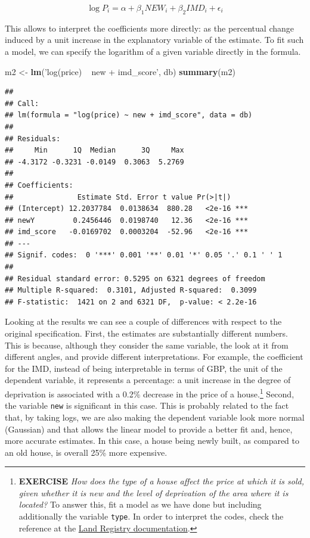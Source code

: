 \documentclass[
]{book}
\newenvironment{Shaded}{\begin{snugshade}}{\end{snugshade}}
\newcommand{\KeywordTok}[1]{\textcolor[rgb]{0.13,0.29,0.53}{\textbf{#1}}}
\newcommand{\NormalTok}[1]{#1}
\newcommand{\StringTok}[1]{\textcolor[rgb]{0.31,0.60,0.02}{#1}}
\begin{document}
\[
\log{P_i} = \alpha + \beta_1 NEW_i + \beta_2 IMD_i + \epsilon_i
\]

This allows to interpret the coefficients more directly: as the percentual change induced by a unit increase in the explanatory variable of the estimate. To fit such a model, we can specify the logarithm of a given variable directly in the formula.

\begin{Shaded}
\begin{Highlighting}[]
\NormalTok{m2 <-}\StringTok{ }\KeywordTok{lm}\NormalTok{(}\StringTok{'log(price) ~ new + imd_score'}\NormalTok{, db)}
\KeywordTok{summary}\NormalTok{(m2)}
\end{Highlighting}
\end{Shaded}

\begin{verbatim}
## 
## Call:
## lm(formula = "log(price) ~ new + imd_score", data = db)
## 
## Residuals:
##     Min      1Q  Median      3Q     Max 
## -4.3172 -0.3231 -0.0149  0.3063  5.2769 
## 
## Coefficients:
##               Estimate Std. Error t value Pr(>|t|)    
## (Intercept) 12.2037784  0.0138634  880.28   <2e-16 ***
## newY         0.2456446  0.0198740   12.36   <2e-16 ***
## imd_score   -0.0169702  0.0003204  -52.96   <2e-16 ***
## ---
## Signif. codes:  0 '***' 0.001 '**' 0.01 '*' 0.05 '.' 0.1 ' ' 1
## 
## Residual standard error: 0.5295 on 6321 degrees of freedom
## Multiple R-squared:  0.3101, Adjusted R-squared:  0.3099 
## F-statistic:  1421 on 2 and 6321 DF,  p-value: < 2.2e-16
\end{verbatim}

Looking at the results we can see a couple of differences with respect to the original specification. First, the estimates are substantially different numbers. This is because, although they consider the same variable, the look at it from different angles, and provide different interpretations. For example, the coefficient for the IMD, instead of being interpretable in terms of GBP, the unit of the dependent variable, it represents a percentage: a unit increase in the degree of deprivation is associated with a 0.2\% decrease in the price of a house.\footnote{\textbf{EXERCISE} \emph{How does the type of a house affect the price at which it is sold, given whether it is new and the level of deprivation of the area where it is located?} To answer this, fit a model as we have done but including additionally the variable \texttt{type}. In order to interpret the codes, check the reference at the \href{https://www.gov.uk/guidance/about-the-price-paid-data\#explanations-of-column-headers-in-the-ppd}{Land Registry documentation}.} Second, the variable \texttt{new} is significant in this case. This is probably related to the fact that, by taking logs, we are also making the dependent variable look more normal (Gaussian) and that allows the linear model to provide a better fit and, hence, more accurate estimates. In this case, a house being newly built, as compared to an old house, is overall 25\% more expensive.
\end{document}
